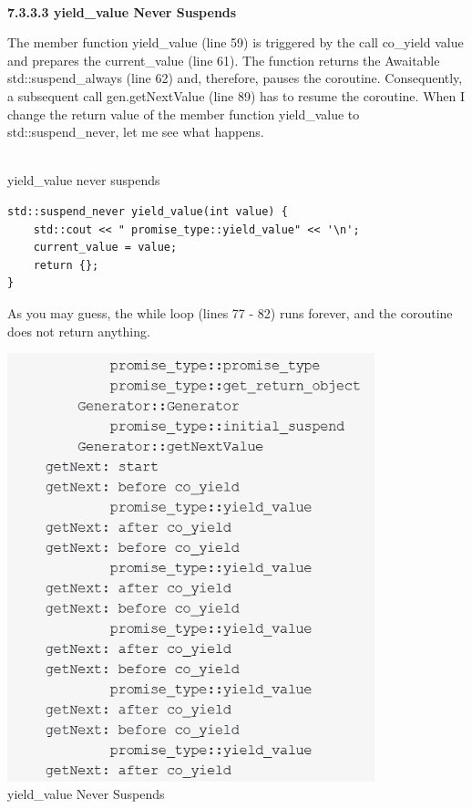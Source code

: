 \hspace*{\fill} \\ %
\noindent
\textbf{7.3.3.3\hspace{0.2cm} yield\_value Never Suspends}

The member function yield\_value (line 59) is triggered by the call co\_yield value and prepares the current\_value (line 61). The function returns the Awaitable std::suspend\_always (line 62) and, therefore, pauses the coroutine. Consequently, a subsequent call gen.getNextValue (line 89) has to resume the coroutine. When I change the return value of the member function yield\_value to std::suspend\_never, let me see what happens.

\hspace*{\fill} \\ %
\noindent
yield\_value never suspends
\begin{lstlisting}[style=styleCXX]
std::suspend_never yield_value(int value) {
	std::cout << " promise_type::yield_value" << '\n';
	current_value = value;
	return {};
}
\end{lstlisting}

As you may guess, the while loop (lines 77 - 82) runs forever, and the coroutine does not return anything.

\begin{center}
\includegraphics[width=0.8\textwidth]{content/3/chapter7/images/17.png}\\
yield\_value Never Suspends
\end{center}

